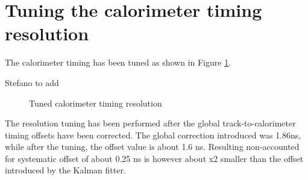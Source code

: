 
\section{Tuning the calorimeter timing resolution}

The calorimeter timing has been tuned as shown in Figure \ref{fig:calorimeter_timing_resolution_2batch}.

{\red Stefano to add }

\begin{figure}[h]
  \hspace{-0.6in}
  \caption{
    \label{fig:calorimeter_timing_resolution_2batch}
    Tuned calorimeter timing resolution 
  }
\end{figure}

The resolution tuning has been performed after the global track-to-calorimeter timing offsets
have been corrected. The global correction introduced was 1.86ns, while after the tuning, the offset
value is about 1.6 ns. Resulting non-accounted for systematic offset of about 0.25 ns is however
about x2 smaller than the offset introduced by the Kalman fitter. 